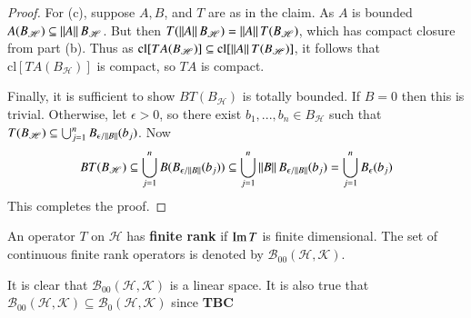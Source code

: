 \begin{proof}
    For (c), suppose $A,B$, and $T$ are as in the claim. As $A$ is bounded $A(B_{\mathscr{H}}) \subseteq \left|\left| A\right|\right|B_{\mathscr{H}}$. But then $T(\left|\left| A\right|\right|B_{\mathscr{H}}) = \left|\left| A\right|\right|T(B_{\mathscr{H}})$, which has compact closure from part (b). Thus as $\text{cl}[TA(B_{\mathscr{H}})] \subseteq \text{cl}[\left|\left| A\right|\right|T(B_{\mathscr{H}})]$, it follows that $\text{cl}[TA(B_{\mathscr{H}})]$ is compact, so $TA$ is compact.

    Finally, it is sufficient to show $BT(B_{\mathscr{H}})$ is totally bounded. If $B = 0$ then this is trivial. Otherwise, let $\epsilon > 0$, so there exist $b_1,...,b_n \in B_{\mathscr{H}}$ such that $T(B_{\mathscr{H}}) \subseteq \bigcup_{j=1}^nB_{\epsilon/\left|\left| B\right|\right|}(b_j)$. Now $$BT(B_{\mathscr{H}}) \subseteq \bigcup_{j=1}^nB(B_{\epsilon/\left|\left| B\right|\right|}(b_j)) \subseteq \bigcup_{j=1}^n\left|\left| B\right|\right|B_{\epsilon/\left|\left| B\right|\right|}(b_j) = \bigcup_{j=1}^nB_{\epsilon}(b_j)$$
    This completes the proof.
\end{proof}

\begin{defn}
    An operator $T$ on $\mathscr{H}$ has \textbf{finite rank} if $\operatorname{Im} T$ is finite dimensional. The set of continuous finite rank operators is denoted by $\mathscr{B}_{00}(\mathscr{H},\mathscr{K})$.
\end{defn}

It is clear that $\mathscr{B}_{00}(\mathscr{H},\mathscr{K})$ is a linear space. It is also true that $\mathscr{B}_{00}(\mathscr{H},\mathscr{K}) \subseteq \mathscr{B}_0(\mathscr{H},\mathscr{K})$ since \textbf{TBC}

